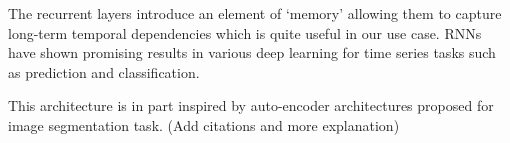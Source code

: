 The recurrent layers introduce an element of `memory' allowing them to capture long-term temporal dependencies which is quite useful in our use case. \cite{Che2018} RNNs have shown promising results in various deep learning for time series tasks such as prediction and classification. \cite{wang2017time, murad2017deep, yang2015deep, Ordonez2016}

This architecture is in part inspired by auto-encoder architectures proposed for image segmentation task. (Add citations and more explanation)